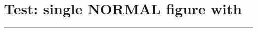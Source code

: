 \documentclass[11pt,a4paper]{article}
\begin{document}
\section{Test: single NORMAL figure with \lipsum[1]}

\begin{swarmwrap}%
  \begin{minipage}[t]{3cm}
    \centering
    \textcolor{red!30}{\rule{\linewidth}{3cm}}
  \end{minipage}%
\end{swarmwrap}%
\swarmwrapnext\lipsum[1]
\end{document}
